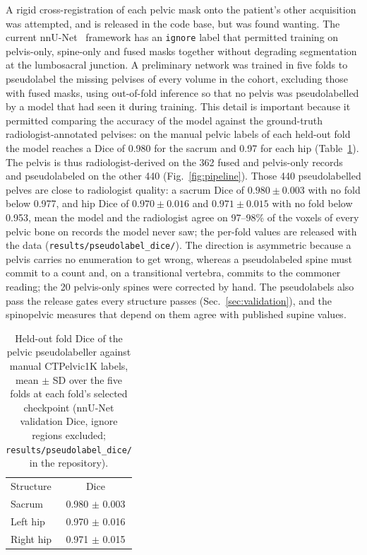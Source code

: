 \documentclass[aapm,mph,amsmath,amssymb,reprint]{revtex4-2}
\begin{document}
A rigid cross-registration of each pelvic mask onto the patient's other acquisition was
attempted, and is released in the code base, but was found wanting. The current
nnU-Net~\cite{nnunet} framework has an \texttt{ignore} label that permitted training on
pelvis-only, spine-only and fused masks together without degrading segmentation at the
lumbosacral junction. A preliminary network was trained in five folds to pseudolabel the
missing pelvises of every volume in the cohort, excluding those with fused masks, using
out-of-fold inference so that no pelvis was pseudolabelled by a model that had seen it during
training. This detail is important because it permitted comparing the accuracy of the model
against the ground-truth radiologist-annotated pelvises: on the manual pelvic labels of each
held-out fold the model reaches a Dice of 0.980 for the sacrum and 0.97 for each hip
(Table~\ref{tab:pseudodice}). The pelvis is thus radiologist-derived on the 362 fused and
pelvis-only records and pseudolabeled on the other 440 (Fig.~\ref{fig:pipeline}). Those 440
pseudolabelled pelves are close to radiologist quality: a sacrum Dice of $0.980 \pm 0.003$
with no fold below 0.977, and hip Dice of $0.970 \pm 0.016$ and $0.971 \pm 0.015$ with no
fold below 0.953, mean the model and the radiologist agree on 97--98\% of the voxels of
every pelvic bone on records the model never saw; the per-fold values are released with the
data (\texttt{results/pseudolabel\_dice/}). The direction is asymmetric because a pelvis
carries no enumeration to get wrong, whereas a pseudolabeled spine must commit to a count
and, on a transitional vertebra, commits to the commoner reading; the 20 pelvis-only spines
were corrected by hand. The pseudolabels also pass the release gates every structure passes
(Sec.~\ref{sec:validation}), and the spinopelvic measures that depend on them agree with
published supine values.

\begin{table}[!ht]
\caption{Held-out fold Dice of the pelvic pseudolabeller against manual CTPelvic1K labels,
mean $\pm$ SD over the five folds at each fold's selected checkpoint (nnU-Net validation
Dice, ignore regions excluded; \texttt{results/pseudolabel\_dice/} in the repository).}
\label{tab:pseudodice}
\begin{ruledtabular}
\begin{tabular}{lc}
Structure & Dice \\ \colrule
Sacrum    & 0.980 $\pm$ 0.003 \\
Left hip  & 0.970 $\pm$ 0.016 \\
Right hip & 0.971 $\pm$ 0.015 \\
\end{tabular}
\end{ruledtabular}
\end{table}
\end{document}
